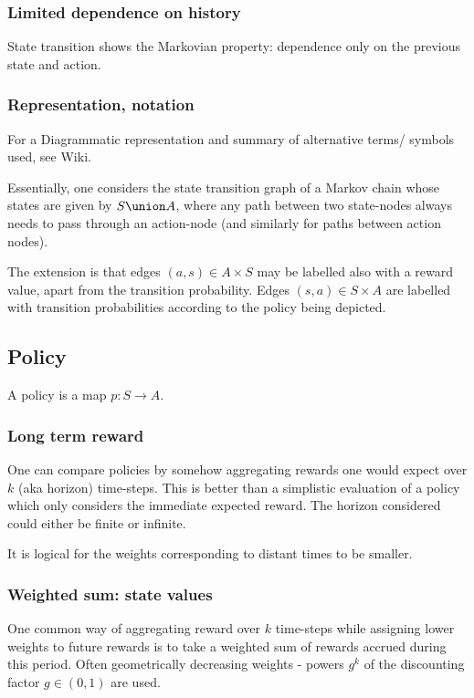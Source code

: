\documentclass[oneside, article]{memoir}
\begin{document}
\subsubsection{Limited dependence on history}
State transition shows the Markovian property: dependence only on the previous state and action.

\subsubsection{Representation, notation}
For a Diagrammatic representation and summary of alternative terms/ symbols used, see Wiki. 

Essentially, one considers the state transition graph of a Markov chain whose states are given by $S \union A$, where any path between two state-nodes always needs to pass through an action-node (and similarly for paths between action nodes).

The extension is that edges $(a, s) \in A \times S$ may be labelled also with a reward value, apart from the transition probability. Edges $(s, a) \in S \times A$ are labelled with transition probabilities according to the policy being depicted.

\subsection{Policy}
A policy is a map $p: S \to A$.

\subsubsection{Long term reward}
One can compare policies by somehow aggregating rewards one would expect over $k$ (aka horizon) time-steps. This is better than a simplistic evaluation of a policy which only considers the immediate expected reward. The horizon considered could either be finite or infinite.

It is logical for the weights corresponding to distant times to be smaller. 

\subsubsection{Weighted sum: state values}
One common way of aggregating reward over $k$ time-steps while assigning lower weights to future rewards is to take a weighted sum of rewards accrued during this period. Often geometrically decreasing weights - powers $g^k$ of the discounting factor $g \in (0, 1)$ are used.
\end{document}
